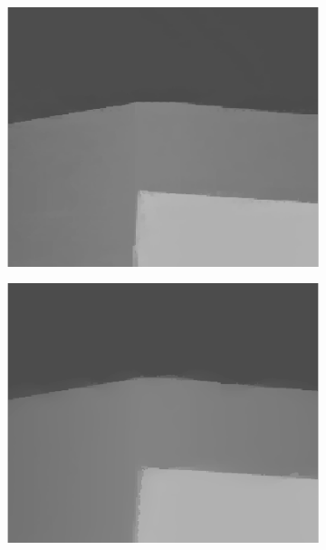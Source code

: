 \documentclass[preprint,10pt,5p,times,twocolumn]{elsarticle}
\begin{document}
\begin{figure}[t]
\begin{center}
\vspace{-0.3cm}
\begin{subfigure}[b]{0.136\linewidth}
    \includegraphics[width=\linewidth]{cmp_book_8X_JG_part.png}
    \label{fig:}
\end{subfigure}
\begin{subfigure}[b]{0.136\linewidth}
    \includegraphics[width=\linewidth]{cmp_book_8X_NLA_part.png}
    \label{fig:} %

\end{subfigure}
\end{center}
\end{figure}
\end{document}
